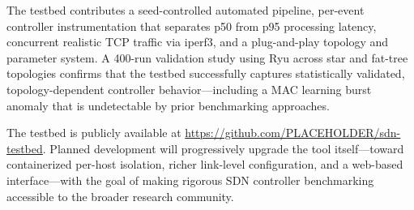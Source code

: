 \documentclass[conference]{IEEEtran}
\begin{document}
The testbed contributes a seed-controlled automated pipeline,
per-event controller instrumentation that separates p50
from p95 processing latency, concurrent realistic TCP
traffic via iperf3, and a plug-and-play topology and
parameter system. A 400-run validation study using Ryu
across star and fat-tree topologies confirms that the
testbed successfully captures statistically validated,
topology-dependent controller behavior---including a
MAC learning burst anomaly that is undetectable by
prior benchmarking approaches.

The testbed is publicly available at
\url{https://github.com/PLACEHOLDER/sdn-testbed}.
Planned development will progressively upgrade the tool
itself---toward containerized per-host isolation, richer
link-level configuration, and a web-based interface---with
the goal of making rigorous SDN controller benchmarking
accessible to the broader research community.



\end{document}
